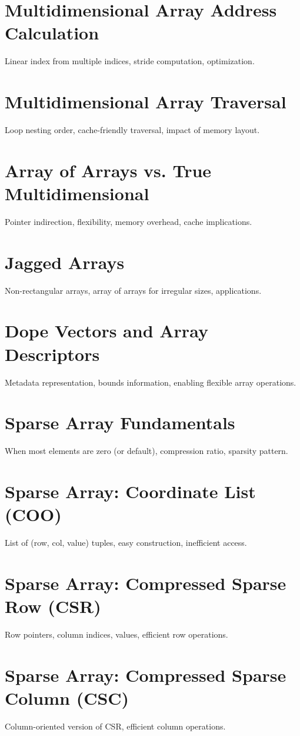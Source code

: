 \chapter{Multidimensional Array Address Calculation}
Linear index from multiple indices, stride computation, optimization.

\chapter{Multidimensional Array Traversal}
Loop nesting order, cache-friendly traversal, impact of memory layout.

\chapter{Array of Arrays vs. True Multidimensional}
Pointer indirection, flexibility, memory overhead, cache implications.

\chapter{Jagged Arrays}
Non-rectangular arrays, array of arrays for irregular sizes, applications.

\chapter{Dope Vectors and Array Descriptors}
Metadata representation, bounds information, enabling flexible array operations.

\chapter{Sparse Array Fundamentals}
When most elements are zero (or default), compression ratio, sparsity pattern.

\chapter{Sparse Array: Coordinate List (COO)}
List of (row, col, value) tuples, easy construction, inefficient access.

\chapter{Sparse Array: Compressed Sparse Row (CSR)}
Row pointers, column indices, values, efficient row operations.

\chapter{Sparse Array: Compressed Sparse Column (CSC)}
Column-oriented version of CSR, efficient column operations.

